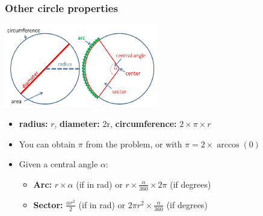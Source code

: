 \begin{frame}
  \frametitle{Other circle properties}
    \begin{center}
      \includegraphics[width=0.5\textwidth]{../img/circle_halim0}
    \end{center}

    \begin{itemize}
      \item {\bf radius:} $r$, {\bf diameter:} 2r, {\bf circumference:} $2\times\pi\times r$
      \item You can obtain $\pi$ from the problem, or with $\pi = 2\times \arccos(0)$
      \item Given a central angle $\alpha$:
      \begin{itemize}
        \item {\bf Arc:} $r\times\alpha$ (if in rad) or $r\times\frac{\alpha}{360}\times2\pi$ (if degrees)
        \item {\bf Sector:} $\frac{\alpha r^2}{2}$ (if in rad) or $2\pi r^2 \times \frac{\alpha}{360}$ (if degrees)
      \end{itemize}
    \end{itemize}
\end{frame}

